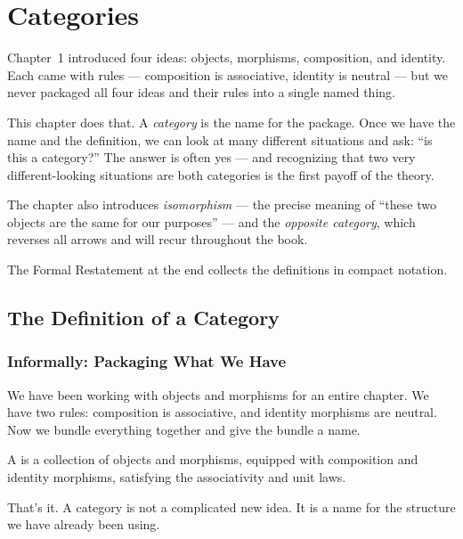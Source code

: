 \chapter{Categories}

\begin{overviewbox}
Chapter~1 introduced four ideas: objects, morphisms, composition, and identity.
Each came with rules --- composition is associative, identity is neutral --- but
we never packaged all four ideas and their rules into a single named thing.

This chapter does that. A \emph{category} is the name for the package. Once we
have the name and the definition, we can look at many different situations and
ask: ``is this a category?'' The answer is often yes --- and recognizing that
two very different-looking situations are both categories is the first payoff of
the theory.

The chapter also introduces \emph{isomorphism} --- the precise meaning of
``these two objects are the same for our purposes'' --- and the \emph{opposite
category}, which reverses all arrows and will recur throughout the book.

The Formal Restatement at the end collects the definitions in compact notation.
\end{overviewbox}


\section{The Definition of a Category}
\label{sec:category-definition}

\subsection{Informally: Packaging What We Have}

We have been working with objects and morphisms for an entire chapter. We have
two rules: composition is associative, and identity morphisms are neutral. Now
we bundle everything together and give the bundle a name.

A  is a collection of objects and morphisms, equipped with
composition and identity morphisms, satisfying the associativity and unit laws.

That's it. A category is not a complicated new idea. It is a name for the
structure we have already been using.

